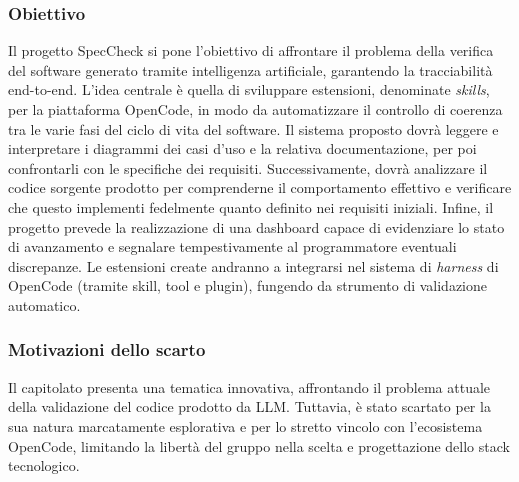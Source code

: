 \documentclass[11pt, a4paper]{article}
\begin{document}
\subsubsection{Obiettivo}
Il progetto SpecCheck si pone l'obiettivo di affrontare il problema della verifica del software generato tramite intelligenza artificiale, garantendo la tracciabilità end-to-end. L'idea centrale è quella di sviluppare estensioni, denominate \textit{skills}, per la piattaforma OpenCode, in modo da automatizzare il controllo di coerenza tra le varie fasi del ciclo di vita del software. \newline
Il sistema proposto dovrà leggere e interpretare i diagrammi dei casi d'uso e la relativa documentazione, per poi confrontarli con le specifiche dei requisiti. Successivamente, dovrà analizzare il codice sorgente prodotto per comprenderne il comportamento effettivo e verificare che questo implementi fedelmente quanto definito nei requisiti iniziali. \newline
Infine, il progetto prevede la realizzazione di una dashboard capace di evidenziare lo stato di avanzamento e segnalare tempestivamente al programmatore eventuali discrepanze. Le estensioni create andranno a integrarsi nel sistema di \textit{harness} di OpenCode (tramite skill, tool e plugin), fungendo da strumento di validazione automatico.

\subsubsection{Motivazioni dello scarto}
Il capitolato presenta una tematica innovativa, affrontando il problema attuale della validazione del codice prodotto da LLM. Tuttavia, è stato scartato per la sua natura marcatamente esplorativa e per lo stretto vincolo con l'ecosistema OpenCode, limitando la libertà del gruppo nella scelta e progettazione dello stack tecnologico.
\end{document}
